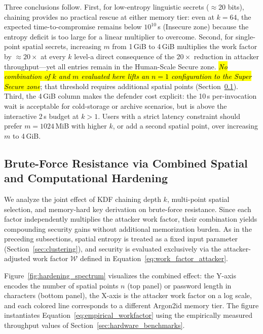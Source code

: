 \documentclass[mathematics,article,accept,pdftex,moreauthors]{Definitions/mdpi}
\begin{document}
{Three conclusions follow. First, for low-entropy linguistic secrets ($\approx$20 bits), chaining provides no practical rescue at either memory tier: even at $k=64$, the expected time-to-compromise remains below $10^{10}$\,s (Insecure zone) because the entropy deficit is too large for a linear multiplier to overcome. Second, for single-point spatial secrets, increasing $m$ from 1\,GiB to 4\,GiB multiplies the work factor by $\approx\!20\times$ at every $k$ level-a direct consequence of the $20\times$ reduction in attacker throughput---yet all entries remain in the Human-Scale Secure zone. \emph{\hl{No combination of $k$ and $m$ evaluated here lifts an $n=1$ configuration to the Super Secure zone}}; %
 that threshold requires additional spatial points (Section~\ref{sec:defense_in_depth}). Third, the 4\,GiB column makes the defender cost explicit: the 10\,s per-invocation wait is acceptable for cold-storage or archive scenarios, but is above the interactive 2\,s budget at $k>1$. Users with a strict latency constraint should prefer $m=1024$\,MiB with higher $k$, or add a second spatial point, over increasing $m$ to 4\,GiB.}


\subsection{Brute-Force Resistance via Combined Spatial and Computational Hardening}
\label{sec:defense_in_depth}

{We analyze the joint effect of KDF chaining depth $k$, multi-point spatial selection, and memory-hard key derivation on brute-force resistance. Since each factor independently multiplies the attacker work factor, their combination yields compounding security gains without additional memorization burden.} As in the preceding subsections, spatial entropy is treated as a fixed input parameter (Section~\ref{sec:clustering}), and security is evaluated exclusively via the attacker-adjusted work factor $\mathcal{W}$ defined in Equation~\eqref{eq:work_factor_attacker}.

Figure~\ref{fig:hardening_spectrum} visualizes the combined effect: the Y-axis encodes the number of spatial points $n$ (top panel) or password length in characters (bottom panel), the X-axis is the attacker work factor on a log scale, and each colored line corresponds to a different Argon2id memory tier. The figure instantiates Equation~\eqref{eq:empirical_workfactor} using the empirically measured throughput values of Section~\ref{sec:hardware_benchmarks}.
\end{document}
